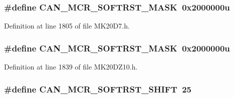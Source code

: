 \subsubsection[{\texorpdfstring{C\+A\+N\+\_\+\+M\+C\+R\+\_\+\+S\+O\+F\+T\+R\+S\+T\+\_\+\+M\+A\+SK}{CAN_MCR_SOFTRST_MASK}}]{\setlength{\rightskip}{0pt plus 5cm}\#define C\+A\+N\+\_\+\+M\+C\+R\+\_\+\+S\+O\+F\+T\+R\+S\+T\+\_\+\+M\+A\+SK~0x2000000u}\hypertarget{group___c_a_n___register___masks_gab9b1cfdb7014655d12f0a5ebafb3fc9b}{}\label{group___c_a_n___register___masks_gab9b1cfdb7014655d12f0a5ebafb3fc9b}


Definition at line 1805 of file M\+K20\+D7.\+h.

\subsubsection[{\texorpdfstring{C\+A\+N\+\_\+\+M\+C\+R\+\_\+\+S\+O\+F\+T\+R\+S\+T\+\_\+\+M\+A\+SK}{CAN_MCR_SOFTRST_MASK}}]{\setlength{\rightskip}{0pt plus 5cm}\#define C\+A\+N\+\_\+\+M\+C\+R\+\_\+\+S\+O\+F\+T\+R\+S\+T\+\_\+\+M\+A\+SK~0x2000000u}\hypertarget{group___c_a_n___register___masks_gab9b1cfdb7014655d12f0a5ebafb3fc9b}{}\label{group___c_a_n___register___masks_gab9b1cfdb7014655d12f0a5ebafb3fc9b}


Definition at line 1839 of file M\+K20\+D\+Z10.\+h.

\subsubsection[{\texorpdfstring{C\+A\+N\+\_\+\+M\+C\+R\+\_\+\+S\+O\+F\+T\+R\+S\+T\+\_\+\+S\+H\+I\+FT}{CAN_MCR_SOFTRST_SHIFT}}]{\setlength{\rightskip}{0pt plus 5cm}\#define C\+A\+N\+\_\+\+M\+C\+R\+\_\+\+S\+O\+F\+T\+R\+S\+T\+\_\+\+S\+H\+I\+FT~25}\hypertarget{group___c_a_n___register___masks_gadff8b8b1d5645fca57a02109df3e507b}{}\label{group___c_a_n___register___masks_gadff8b8b1d5645fca57a02109df3e507b}


